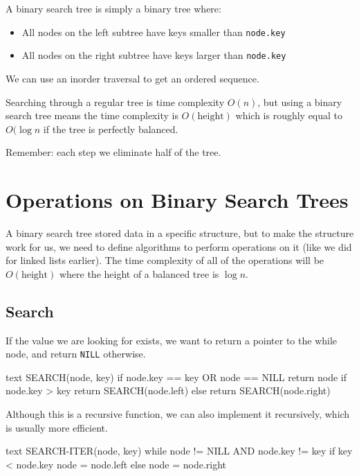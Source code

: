 A binary search tree is simply a binary tree where:
\begin{itemize}
    \item All nodes on the left subtree have keys smaller than \texttt{node.key}
    \item All nodes on the right subtree have keys larger than \texttt{node.key}
\end{itemize}
We can use an inorder traversal to get an ordered sequence.

Searching through a regular tree is time complexity \(O(n)\), but using a binary search tree means the time complexity is \(O(\text{height})\) which is roughly equal to \(O(\log n\) if the tree is perfectly balanced.
\begin{note}
    Remember: each step we eliminate half of the tree.
\end{note}

\section{Operations on Binary Search Trees}\label{sec:operations_on_binary_search_trees}

A binary search tree stored data in a specific structure, but to make the structure work for us, we need to define algorithms to perform operations on it (like we did for linked lists earlier).
The time complexity of all of the operations will be \(O(\text{height})\) where the height of a balanced tree is \(\log n\).

\subsection{Search}\label{sub:searchbst}

If the value we are looking for exists, we want to return a pointer to the while node, and return \texttt{NILL} otherwise.
\begin{code}{text}
    SEARCH(node, key)
        if node.key == key OR node == NILL
            return node
        if node.key > key
            return SEARCH(node.left)
        else
            return SEARCH(node.right)
\end{code}
Although this is a recursive function, we can also implement it recursively, which is usually more efficient.
\begin{code}{text}
    SEARCH-ITER(node, key)
        while node != NILL AND node.key != key
            if key < node.key
                node = node.left
            else
                node = node.right
\end{code}

